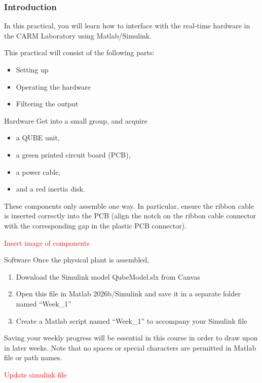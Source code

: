 \documentclass[9pt]{beamer-control}
\begin{document}

\begin{frame}
\frametitle{Introduction}
In this practical, you will learn how to interface with the real-time hardware in the CARM Laboratory using Matlab/Simulink.

\vfill

This practical will consist of the following parts:
\begin{itemize}
\item Setting up
\item Operating the hardware
\item Filtering the output
\end{itemize}
\end{frame}


\begin{frame}{Hardware}
Get into a small group, and acquire 
\begin{itemize}
	\item a QUBE unit,
	\item a green printed circuit board (PCB),
	\item a power cable,
	\item and a red inertia disk.
\end{itemize}  

These components only assemble one way. In particular, ensure the ribbon cable is inserted correctly into the PCB (align the notch on the ribbon cable connector with the corresponding gap in the plastic PCB connector).

\textcolor{red}{Insert image of components}


\end{frame}


\begin{frame}{Software}
Once the physical plant is assembled, 
\begin{enumerate}
\item Download the Simulink model QubeModel.slx from Canvas
\item Open this file in Matlab 2026b/Simulink and save it in a separate folder named “Week\_1”
\item Create a Matlab script named “Week\_1” to accompany your Simulink file
\end{enumerate}

Saving your weekly progress will be essential in this course in order to draw upon in later weeks. Note that no spaces or special characters are permitted in Matlab file or path names.

\textcolor{red}{Update simulink file}
\end{frame}
\end{document}
